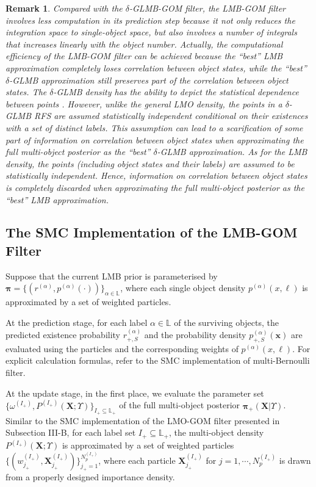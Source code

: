 \documentclass[journal]{IEEEtran}
\newcommand{\bX}{{\mathbf X}}
\newcommand{\bx}{{\mathbf x}}
\newcommand{\bpi}{{\boldsymbol\pi}}
\newtheorem{Rem}{Remark}
\begin{document}
{\begin{Rem}
Compared with the $\delta$-GLMB-GOM filter, the LMB-GOM filter involves  less computation in its prediction step because it not only reduces the integration space to single-object space, but also involves a number of integrals that increases linearly with the object number.  Actually, the computational efficiency of the LMB-GOM filter can be achieved because  the ``best'' LMB approximation completely loses correlation between object states,  while  the ``best''  $\delta$-GLMB approximation still preserves part of the correlation between object states.  The $\delta$-GLMB density has the ability to depict the statistical dependence between points \cite{refr:label_6}. However, unlike the general LMO density,  the points in a $\delta$-GLMB RFS are assumed statistically independent conditional on their existences with a set of distinct labels. This  assumption can lead to a scarification of some part of information on correlation between object states when approximating the full multi-object posterior as the ``best'' $\delta$-GLMB  approximation. As for the LMB density, the points (including object states and their labels) are  assumed to be statistically independent.  Hence, information on correlation between object states is completely discarded when approximating the full multi-object posterior as the ``best'' LMB approximation. 
\end{Rem}
\subsection{The SMC Implementation of the LMB-GOM Filter}



Suppose that the current  LMB prior is parameterised by  $\bpi=\{(r^{(\alpha)},p^{(\alpha)}(\cdot))\}_{\alpha\in\mathbb{L}}$, where each single object density 
$p^{(\alpha)}(x,\ell)$  is approximated by a set of weighted particles. 

At the prediction stage, for each label $\alpha\in\mathbb{L}$ of the surviving objects, the predicted existence probability $r^{(\alpha)}_{+,S}$ and the probability density  $p^{(\alpha)}_{+,S}(\bx)$ are evaluated using the particles and the corresponding weights of $p^{(\alpha)}(x,\ell)$. For explicit calculation formulas, refer to the SMC implementation of multi-Bernoulli filter\cite{refr:MeMber_filter1}.

At the update stage, in the first place, we evaluate the parameter set $\{\omega^{(I_{+})}, P^{(I_{+})}(\bX;\Upsilon) \}_{I_{+}\subseteq \mathbb{L}_{+}}$ of the full multi-object posterior $\bpi_{+}(\bX|\Upsilon)$.  Similar to the SMC implementation of the LMO-GOM filter presented in Subsection III-B, for each label set $I_{+}\subseteq \mathbb{L}_{+}$, the multi-object density  $P^{(I_{+})}(\bX;\Upsilon)$ is approximated  by a set of weighted particles  $\{(w_{j_{+}}^{(I_{+})},\bX_{j_{+}}^{(I_{+})})\}^{N_{p}^{(I_{+})}}_{j_{+}=1}$,
where each particle $\bX_{j_{+}}^{(I_{+})}$ for $j=1,\cdots, N_{p}^{(I_{+})}$ is drawn from a   properly designed  importance density.

}
\end{document}
